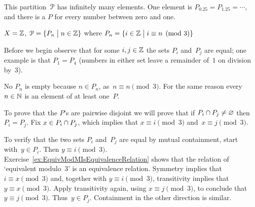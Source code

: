 \documentclass{ibl}  %
\begin{document}
\begin{problem}
\begin{exes}
\begin{answer}
  This partition~$\EuScript{P}$ has infinitely many elements.
  One element is $P_{0.25}=P_{1.25}=\cdots$, and there is a $P$ for every
  number between zero and one.  
\end{answer}
\begin{exercise} 
     $X=\mathbb{Z}$, $\EuScript{P}=\{P_n \bigm| n\in\mathbb{Z}\}$
      where $P_n=\{i\in\mathbb{Z} \bigm| i\equiv n\pmod 3\}$
\end{exercise}
\begin{answer}
  Before we begin observe that 
  for some $i,j\in\mathbb{Z}$ the sets $P_i$ and~$P_j$ are equal;
  one example is that $P_1=P_4$ (numbers in either set leave a remainder 
  of~$1$ on division by~$3$).

  No $P_n$ is empty because $n\in P_n$, as~$n\equiv n\pmod 3$.
  For the same reason every~$n\in\mathbb{N}$ is an element of at least
  one~$P$.

  To prove that the $P$'s are pairwise disjoint
  we will prove that if 
  $P_i\cap P_j\neq \varnothing$ then $P_i=P_j$.
  Fix $x\in P_i\cap P_j$, which implies that
  $x\equiv i\pmod 3$ and~$x\equiv j\pmod 3$.

  To verify that the two sets $P_i$ and~$P_j$ are equal by mutual
  containment, start with~$y\in P_i$.
  Then $y\equiv i\pmod 3$.
  Exercise~\ref{ex:EquivModMIsEquivalenceRelation}
  shows that the relation of `equivalent modulo~$3$' is an 
  equivalence relation.
  Symmetry implies that $i\equiv x\pmod 3$ and, 
  together with $y\equiv i\pmod 3$,
  transitivity implies that $y\equiv x\pmod 3$.
  Apply transitivity again, using $x\equiv j\pmod 3$, to conclude that
  $y\equiv j\pmod 3$. 
  Thus~$y\in P_j$.
  Containment in the other direction is similar.  


\end{answer}
\end{exes}
\end{problem}
\end{document}
